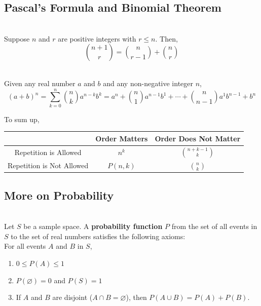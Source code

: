 \documentclass[12pt]{article}
\begin{document}
\subsection{Pascal's Formula and Binomial Theorem}
\begin{theorem}
\hfill\\
\normalfont Suppose $n$ and $r$ are positive integers with $r\leq n$. Then,
\[
\binom{n+1}{r}=\binom{n}{r-1}+\binom{n}{r}
\]
\end{theorem}
\begin{theorem}
\hfill\\
\normalfont Given any real number $a$ and $b$ and any non-negative integer $n$, 
\[
(a+b)^n = \sum^{n}_{k=0}\binom{n}{k}a^{n-k}b^{k} = a^n + \binom{n}{1}a^{n-1}b^1+\cdots+\binom{n}{n-1}a^1b^{n-1}+b^n
\]
\end{theorem}
To sum up,
\begin{table}[h]
\centering
\begin{tabular}{|c|c|c|}
\hline
&Order Matters& Order Does Not Matter\\\hline
Repetition is Allowed&$n^k$&$\binom{n+k-1}{k}$\\\hline
Repetition is Not Allowed&$P(n,k)$&$\binom{n}{k}$\\\hline
\end{tabular}
\end{table}
\subsection{More on Probability}
\hfill\\
\normalfont Let $S$ be a sample space. A \textbf{probability function} $P$ from the set of all events in $S$ to the set of real numbers satisfies the following axioms: \\
For all events $A$ and $B$ in $S$,
\begin{enumerate}
\item $0\leq P(A)\leq 1$
\item $P(\varnothing)=0$ and $P(S)=1$
\item If $A$ and $B$ are disjoint ($A\cap B = \varnothing$), then $P(A\cup B)=P(A)+P(B)$.
\end{enumerate}
\end{document}
